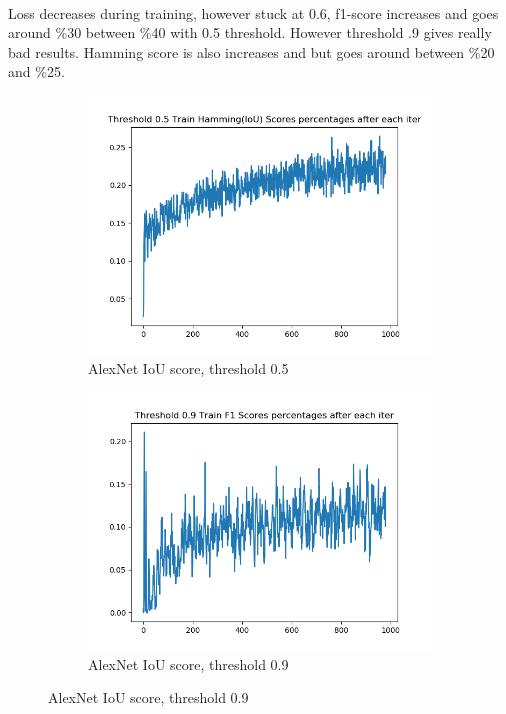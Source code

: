 \paragraph{}Loss decreases during training, however stuck at 0.6, f1-score increases and goes around \%30 between \%40 with 0.5 threshold. However threshold .9 gives really bad results. Hamming score is also increases and but goes around between \%20 and \%25.
\begin{figure}[!ht]
\centering
\begin{subfigure}{.5\textwidth}
	\centering
	\includegraphics[width=1\linewidth]{alexnet-lazy-1_0-train-scores-hs-5.png}
	\caption{\label{alexnet:alexnet-lazy-1_0-train-scores-hs-5}AlexNet IoU score, threshold 0.5}
\end{subfigure}%
\begin{subfigure}{.5\textwidth}
	\centering
	\includegraphics[width=1\linewidth]{alexnet-lazy-1_0-train-scores-f1-9.png}
	\caption{\label{alexnet:alexnet-lazy-1_0-train-scores-hs-9}AlexNet IoU score, threshold 0.9}
\end{subfigure}
\end{figure}

